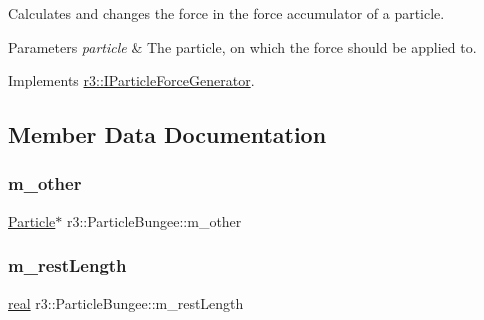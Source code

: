 Calculates and changes the force in the force accumulator of a particle. 


\begin{DoxyParams}{Parameters}
{\em particle} & The particle, on which the force should be applied to. \\
\hline
\end{DoxyParams}


Implements \mbox{\hyperlink{classr3_1_1_i_particle_force_generator_af705063c5d7debca0f7a5c5c68c28f50}{r3\+::\+I\+Particle\+Force\+Generator}}.



\subsection{Member Data Documentation}
\mbox{\label{classr3_1_1_particle_bungee_ab5c8ec0ee5390b785e02e4dac28f9b5c}} 
\subsubsection{\texorpdfstring{m\+\_\+other}{m\_other}}
{\footnotesize\ttfamily \mbox{\hyperlink{classr3_1_1_particle}{Particle}}$\ast$ r3\+::\+Particle\+Bungee\+::m\+\_\+other\hspace{0.3cm}{\ttfamily [protected]}}

\mbox{\label{classr3_1_1_particle_bungee_aeefefba54d7f8080424c17d12cb9ca06}} 
\subsubsection{\texorpdfstring{m\+\_\+rest\+Length}{m\_restLength}}
{\footnotesize\ttfamily \mbox{\hyperlink{namespacer3_ab2016b3e3f743fb735afce242f0dc1eb}{real}} r3\+::\+Particle\+Bungee\+::m\+\_\+rest\+Length\hspace{0.3cm}{\ttfamily [protected]}}

\mbox{\label{classr3_1_1_particle_bungee_a5fb1a60d165188d6871ba8b6410c9e84}} 
